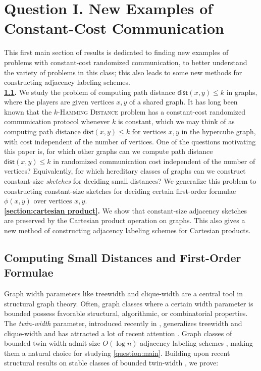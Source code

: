 \documentclass{article}
\newcommand{\dist}{\mathsf{dist}}
\begin{document}
\section{Question I. New Examples of Constant-Cost Communication}
\label{sec:new_examples}

This first main section of results is dedicated to finding new examples of problems with
constant-cost randomized communication, to better understand the variety of problems in this class;
this also leads to some new methods for constructing adjacency labeling schemes.\\

\noindent
\textbf{\cref{section:twin-width}.} We study the problem of computing path distance $\dist(x,y) \leq k$
in graphs, where the players are given vertices $x,y$ of a shared graph.  It has long been known
\cite{Yao03,HSZZ06} that the \textsc{$k$-Hamming Distance} problem has a constant-cost randomized
communication protocol whenever $k$ is constant, which we may think of as computing path distance
$\dist(x,y) \leq k$ for vertices $x,y$ in the hypercube graph, with cost independent of the number
of vertices. One of the questions motivating this paper is, for which other graphs can we compute
path distance $\dist(x,y) \leq k$ in randomized communication cost independent of the number of
vertices? Equivalently, for which hereditary classes of graphs can we construct constant-size
\emph{sketches} for deciding small distances? We generalize this problem to constructing
constant-size sketches for deciding certain first-order formulae $\phi(x,y)$ over vertices $x,y$.\\

\noindent
\textbf{\cref{section:cartesian product}.} We show that constant-size adjacency sketches are
preserved by the Cartesian product operation on graphs. This also gives a new method of constructing
adjacency labeling schemes for Cartesian products.

\subsection{Computing Small Distances and First-Order Formulae}
\label{section:twin-width}

Graph width parameters like treewidth \cite{robertson1986graph} and clique-width
\cite{courcelle1993handle} are a central tool in structural graph theory. Often, graph classes where
a certain width parameter is bounded possess favorable structural, algorithmic, or combinatorial
properties.  The \emph{twin-width} parameter, introduced recently in \cite{BKTW20}, generalizes
treewidth and clique-width and has attracted a lot of recent attention
\cite{GPT21,schidler2021sat,ahn2021bounds,balaban2021twin}.  Graph classes of
bounded twin-width admit size $O(\log n)$ adjacency labeling schemes \cite{BGK+21a}, making them a
natural choice for studying \cref{question:main}. Building upon recent structural results on stable
classes of bounded twin-width \cite{GPT21}, we prove:
\end{document}
